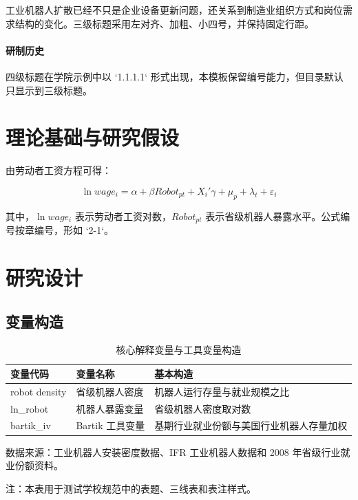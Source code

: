 \documentclass[UTF8, zihao=-4, a4paper, openany, fontset=none]{ctexrep}
\numberwithin{equation}{chapter}
\newcommand{\tablenote}[1]{%
  \par\vspace{2pt}\begingroup\zihao{5}\noindent #1\par\endgroup
}
\begin{document}
工业机器人扩散已经不只是企业设备更新问题，还关系到制造业组织方式和岗位需求结构的变化。三级标题采用左对齐、加粗、小四号，并保持固定行距。

\subsubsection{研制历史}

四级标题在学院示例中以 `1.1.1.1` 形式出现，本模板保留编号能力，但目录默认只显示到三级标题。

\chapter{理论基础与研究假设}

由劳动者工资方程可得：

\begin{equation}
\ln wage_i = \alpha + \beta Robot_{pt} + X_i'\gamma + \mu_p + \lambda_t + \varepsilon_i
\end{equation}

其中，$\ln wage_i$ 表示劳动者工资对数，$Robot_{pt}$ 表示省级机器人暴露水平。公式编号按章编号，形如 `2-1`。

\chapter{研究设计}

\section{变量构造}

\begin{table}[htbp]
  \centering
  \caption{核心解释变量与工具变量构造}
  \begin{tabular}{p{}p{}p{}}
    \toprule
    变量代码 & 变量名称 & 基本构造 \\
    \midrule
    robot density & 省级机器人密度 & 机器人运行存量与就业规模之比 \\
    ln\_robot & 机器人暴露变量 & 省级机器人密度取对数 \\
    bartik\_iv & Bartik 工具变量 & 基期行业就业份额与美国行业机器人存量加权 \\
    \bottomrule
  \end{tabular}
  \tablenote{数据来源：工业机器人安装密度数据、IFR 工业机器人数据和 2008 年省级行业就业份额资料。}
  \tablenote{注：本表用于测试学校规范中的表题、三线表和表注样式。}
\end{table}
\end{document}
